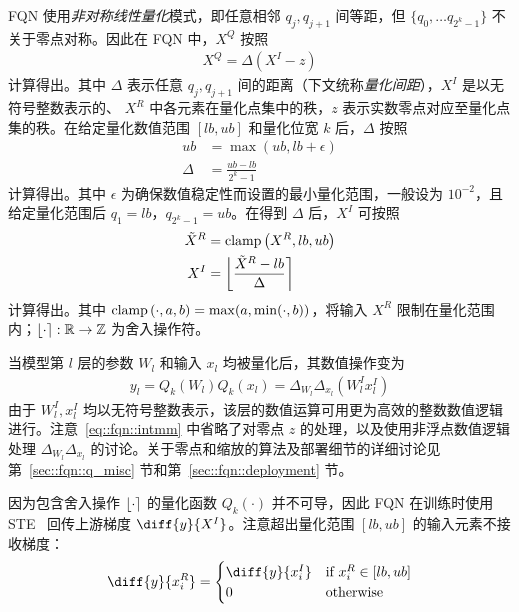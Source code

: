 FQN 使用\emph{非对称线性量化}模式，即任意相邻 $q_j, q_{j+1}$ 间等距，但 $\{q_0, \ldots q_{2^k-1}\}$ 不关于零点对称。因此在 FQN 中，$X^Q$ 按照
\begin{align}
  X^Q = \Delta (X^I - z) \label{eq::fqn::asymm_linear_q}
\end{align}
计算得出。其中 $\Delta$ 表示任意 $q_j, q_{j+1}$ 间的距离（下文统称\emph{量化间距}），$X^I$ 是以无符号整数表示的、 $X^R$ 中各元素在量化点集中的秩，$z$ 表示实数零点对应至量化点集的秩。在给定量化数值范围 $[lb, ub]$ 和量化位宽 $k$ 后，$\Delta$ 按照
\begin{align}
  ub &= \max(ub, lb + \epsilon) \\
  \Delta &= \frac{ub - lb}{2^k - 1}
\end{align}
计算得出。其中 $\epsilon$ 为确保数值稳定性而设置的最小量化范围，一般设为 $10^{-2}$，且给定量化范围后 $q_1 = lb$，$q_{2^k-1} = ub$。在得到 $\Delta$ 后，$X^I$ 可按照
\begin{align}
  \tilde{X}^R &= \mathrm{clamp}\left( X^R, lb, ub \right) \\
  X^I &= \left\lfloor \frac{\tilde{X}^R - lb}{\Delta} \right\rceil
\end{align}
计算得出。其中 $\mathrm{clamp}\left( \cdot, a, b \right) = \max(a, \min(\cdot, b))$，将输入 $X^R$ 限制在量化范围内；$\left\lfloor \cdot \right\rceil: \mathbb{R}\to\mathbb{Z}$ 为舍入操作符。

当模型第 $l$ 层的参数 $W_l$ 和输入 $x_l$ 均被量化后，其数值操作变为
\begin{align}
  y_l = Q_k(W_l) Q_k(x_l) = \Delta_{W_l}\Delta_{x_l} (W^I_l x^I_l) \label{eq::fqn::intmm}
\end{align}
由于 $W^I_l, x^I_l$ 均以无符号整数表示，该层的数值运算可用更为高效的整数数值逻辑进行。注意~\eqref{eq::fqn::intmm} 中省略了对零点 $z$ 的处理，以及使用非浮点数值逻辑处理 $\Delta_{W_l}\Delta_{x_l}$ 的讨论。关于零点和缩放的算法及部署细节的详细讨论见第~\ref{sec::fqn::q_misc} 节和第~\ref{sec::fqn::deployment} 节。

因为包含舍入操作 $\left\lfloor \cdot \right\rceil$ 的量化函数 $Q_k(\cdot)$ 并不可导，因此 FQN 在训练时使用 STE~\citep{bengio2013estimating} 回传上游梯度 $\diff{y}{X^I}$。注意超出量化范围 $[lb, ub]$ 的输入元素不接收梯度：
\begin{align}
  \diff{y}{x^R_i} = 
    \begin{cases}
      \diff{y}{x^I_i} & \text{if } x^R_i \in [lb, ub] \\
      0 & \text{otherwise}
    \end{cases}
\end{align}

